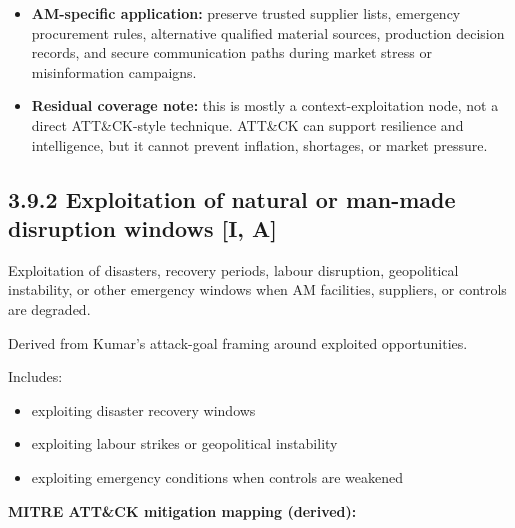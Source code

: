 \documentclass[10pt,a4paper,oneside]{report}
\begin{document}
\begin{itemize}
\item \textbf{AM-specific application:} preserve trusted supplier lists, emergency procurement rules, alternative qualified material sources, production decision records, and secure communication paths during market stress or misinformation campaigns.
\end{itemize}

\begin{itemize}
\item \textbf{Residual coverage note:} this is mostly a context-exploitation node, not a direct ATT\&CK-style technique. ATT\&CK can support resilience and intelligence, but it cannot prevent inflation, shortages, or market pressure.
\end{itemize}


\subsection{3.9.2 Exploitation of natural or man-made disruption windows [I, A]}


Exploitation of disasters, recovery periods, labour disruption, geopolitical instability, or other emergency windows when AM facilities, suppliers, or controls are degraded.

Derived from Kumar's attack-goal framing around exploited opportunities.

Includes:

\begin{itemize}
\item exploiting disaster recovery windows
\item exploiting labour strikes or geopolitical instability
\item exploiting emergency conditions when controls are weakened
\end{itemize}

\textbf{MITRE ATT\&CK mitigation mapping (derived):}
\end{document}
